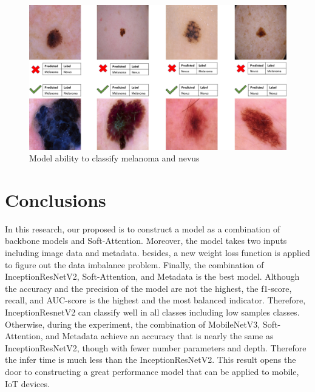 \documentclass[sensors,article,submit,pdftex,moreauthors]{Definitions/mdpi}
\begin{document}
\begin{figure}[H]
	\centering
	\includegraphics[width=1\linewidth]{Definitions/img_class_nevus_mela}
	\caption{Model ability to classify melanoma and nevus}
	\label{fig:nevusVSmela}
\end{figure}

\section{Conclusions}
In this research, our proposed is to construct a model as a combination of backbone models and Soft-Attention. Moreover, the model takes two inputs including image data and metadata. besides, a new weight loss function is applied to figure out the data imbalance problem. Finally, the combination of InceptionResNetV2, Soft-Attention, and Metadata is the best model. Although the accuracy and the precision of the model are not the highest, the f1-score, recall, and AUC-score is the highest and the most balanced indicator. Therefore, InceptionResnetV2 can classify well in all classes including low samples classes. Otherwise, during the experiment, the combination of MobileNetV3, Soft-Attention, and Metadata achieve an accuracy that is nearly the same as InceptionResNetV2, though with fewer number parameters and depth. Therefore the infer time is much less than the InceptionResNetV2. This result opens the door to constructing a great performance model that can be applied to mobile, IoT devices.  
\vspace{6pt} 


\end{document}
